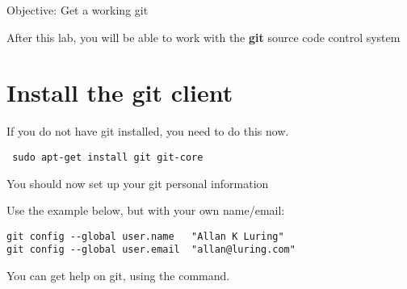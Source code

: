{Objective: Get a working git}

After this lab, you will be able to work with the {\bf git} source code control system

\section{Install the git client}

If you do not have git installed, you need to do this now.

{\small
{\tt
sudo apt-get install git git-core
}
}

You should now set up your git personal information

Use the example below, but with your own name/email:

\begin{verbatim}
git config --global user.name	"Allan K Luring"
git config --global user.email	"allan@luring.com"
\end{verbatim}

You can get help on git, using the  command.
